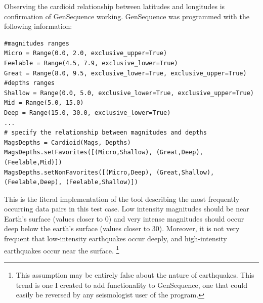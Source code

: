 \noindent{}

\vspace{1cm}
Observing the cardioid relationship between latitudes and longitudes is confirmation of GenSequence working. GenSequence was programmed with the following information:
\vspace{1cm}

\begin{lstlisting}
#magnitudes ranges
Micro = Range(0.0, 2.0, exclusive_upper=True)
Feelable = Range(4.5, 7.9, exclusive_lower=True)
Great = Range(8.0, 9.5, exclusive_lower=True, exclusive_upper=True)
#depths ranges
Shallow = Range(0.0, 5.0, exclusive_lower=True, exclusive_upper=True)
Mid = Range(5.0, 15.0)
Deep = Range(15.0, 30.0, exclusive_lower=True)
...
# specify the relationship between magnitudes and depths
MagsDepths = Cardioid(Mags, Depths)
MagsDepths.setFavorites([(Micro,Shallow), (Great,Deep), (Feelable,Mid)])
MagsDepths.setNonFavorites([(Micro,Deep), (Great,Shallow), (Feelable,Deep), (Feelable,Shallow)])
\end{lstlisting}

\vspace{1cm}
This is the literal implementation of the tool describing the most frequently occurring data pairs in this test case. Low intensity magnitudes should be near Earth's surface (values closer to 0) and very intense magnitudes should occur deep below the earth's surface (values closer to 30). Moreover, it is not very frequent that low-intensity earthquakes occur deeply, and high-intensity earthquakes occur near the surface. \footnote{This assumption may be entirely false about the nature of earthquakes. This trend is one I created to add functionality to GenSequence, one that could easily be reversed by any seismologist user of the program.}

